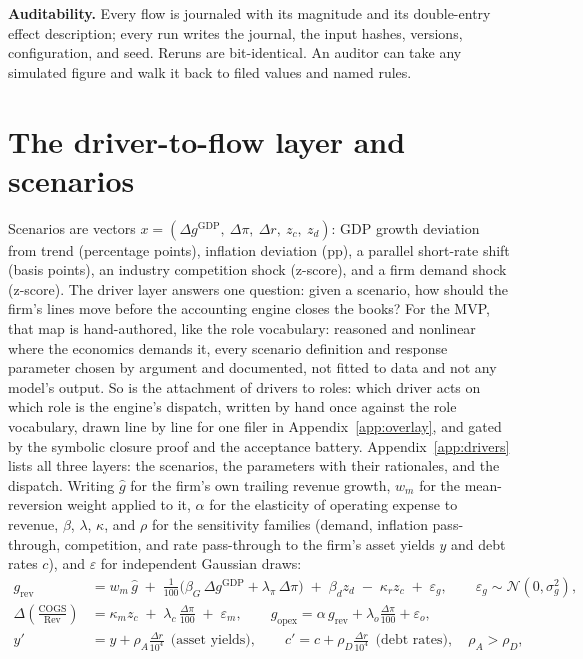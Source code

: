 \documentclass[11pt]{article}
\newcommand{\lead}[2]{\par\addvspace{5pt}\textbf{\textcolor{#1}{#2}}}
\begin{document}
\lead{navytwo}{Auditability.} Every flow is journaled with its magnitude and its double-entry effect description; every run writes the journal, the input hashes, versions, configuration, and seed. Reruns are bit-identical. An auditor can take any simulated figure and walk it back to filed values and named rules.

\section{The driver-to-flow layer and scenarios}
\label{sec:drivers}
Scenarios are vectors $x = (\Delta g^{\text{GDP}},\ \Delta \pi,\ \Delta r,\ z_c,\ z_d)$: GDP growth deviation from trend (percentage points), inflation deviation (pp), a parallel short-rate shift (basis points), an industry competition shock (z-score), and a firm demand shock (z-score). The driver layer answers one question: given a scenario, how should the firm's lines move before the accounting engine closes the books? For the MVP, that map is hand-authored, like the role vocabulary: reasoned and nonlinear where the economics demands it, every scenario definition and response parameter chosen by argument and documented, not fitted to data and not any model's output. So is the attachment of drivers to roles: which driver acts on which role is the engine's dispatch, written by hand once against the role vocabulary, drawn line by line for one filer in Appendix~\ref{app:overlay}, and gated by the symbolic closure proof and the acceptance battery. Appendix~\ref{app:drivers} lists all three layers: the scenarios, the parameters with their rationales, and the dispatch. Writing $\hat{g}$ for the firm's own trailing revenue growth, $w_m$ for the mean-reversion weight applied to it, $\alpha$ for the elasticity of operating expense to revenue, $\beta$, $\lambda$, $\kappa$, and $\rho$ for the sensitivity families (demand, inflation pass-through, competition, and rate pass-through to the firm's asset yields $y$ and debt rates $c$), and $\varepsilon$ for independent Gaussian draws:
\begin{align}
g_{\text{rev}} &= w_m\, \hat{g} \;+\; \tfrac{1}{100}\big(\beta_G\, \Delta g^{\text{GDP}} + \lambda_\pi\, \Delta\pi\big) \;+\; \beta_d z_d \;-\; \kappa_r z_c \;+\; \varepsilon_g,
\qquad \varepsilon_g \sim \mathcal{N}(0, \sigma_g^2), \label{eq:revgrowth}\\
\Delta\!\left(\tfrac{\text{COGS}}{\text{Rev}}\right) &= \kappa_m z_c \;+\; \lambda_c\, \tfrac{\Delta\pi}{100} \;+\; \varepsilon_m,
\qquad
g_{\text{opex}} = \alpha\, g_{\text{rev}} + \lambda_o \tfrac{\Delta\pi}{100} + \varepsilon_o, \label{eq:margin}\\
y' &= y + \rho_A \tfrac{\Delta r}{10^4} \ \ \text{(asset yields)},
\qquad
c' = c + \rho_D \tfrac{\Delta r}{10^4} \ \ \text{(debt rates)}, \quad \rho_A > \rho_D, \label{eq:rates}
\end{align}
\end{document}

